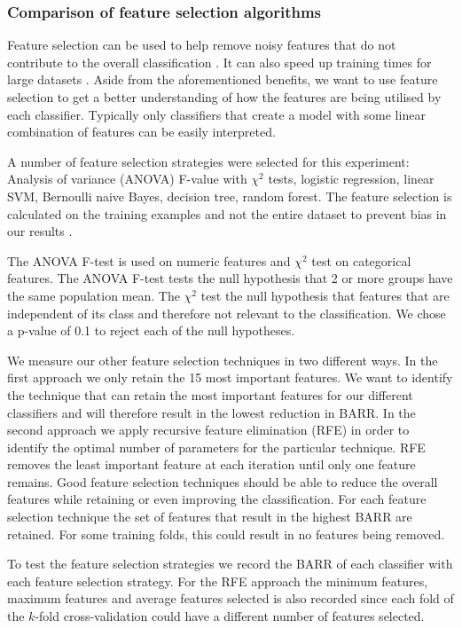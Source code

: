 \documentclass{sig-alternate-05-2015}
\begin{document}
	\subsubsection{Comparison of feature selection algorithms}
	Feature selection can be used to help remove noisy features that do not contribute to the overall classification \cite{Guyon:2003:IVF:944919.944968}. It can also speed up training times for large datasets \cite{Guyon:2003:IVF:944919.944968}. Aside from the aforementioned benefits, we want to use feature selection to get a better understanding of how the features are being utilised by each classifier. Typically only classifiers that create a model with some linear combination of features can be easily interpreted.
	
	A number of feature selection strategies were selected for this experiment: Analysis of variance (ANOVA) F-value with $\chi^2$ tests, logistic regression, linear SVM, Bernoulli naive Bayes, decision tree, random forest. The feature selection is calculated on the training examples and not the entire dataset to prevent bias in our results \cite{PMID:25988841}.
	
	The ANOVA F-test is used on numeric features and $\chi^2$ test on categorical features. The ANOVA F-test tests the null hypothesis that 2 or more groups have the same population mean. The $\chi^2$ test the null hypothesis that features that are independent of its class and therefore not relevant to the classification. We chose a p-value of 0.1 to reject each of the null hypotheses. 
	
	We measure our other feature selection techniques in two different ways. In the first approach we only retain the 15 most important features. We want to identify the technique that can retain the most important features for our different classifiers and will therefore result in the lowest reduction in BARR. In the second approach we apply recursive feature elimination (RFE) in order to identify the optimal number of parameters for the particular technique. RFE removes the least important feature at each iteration until only one feature remains. Good feature selection techniques should be able to reduce the overall features while retaining or even improving the classification. For each feature selection technique the set of features that result in the highest BARR are retained. For some training folds, this could result in no features being removed. 
	
	To test the feature selection strategies we record the BARR of each classifier with each feature selection strategy. For the RFE approach the minimum features, maximum features and average features selected is also recorded since each fold of the $k$-fold cross-validation could have a different number of features selected.
	
\end{document}
